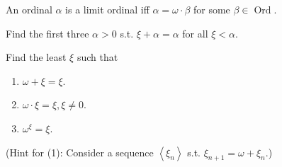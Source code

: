 \documentclass{ctexart}
\DeclareMathOperator{\ord}{Ord}
\begin{document}
\begin{problem}
An ordinal $\alpha$ is a limit ordinal iff $\alpha=\omega \cdot \beta$ for some $\beta \in\ord$.
\end{problem}



\begin{problem}
Find the first three $\alpha>0$ s.t. $\xi+\alpha=\alpha$ for all $\xi<\alpha$.
\end{problem}



\begin{problem}
Find the least $\xi$ such that
\begin{enumerate}[label=\alph*,ref=\theproblem.\alph*]
\item  $\omega+\xi=\xi$.
\item  $\omega \cdot \xi=\xi, \xi \neq 0$.
\item  $\omega^{\xi}=\xi$.
\end{enumerate}
(Hint for (1): Consider a sequence $\left\langle\xi_n\right\rangle$ s.t. $\xi_{n+1}=\omega+\xi_n$.)
\end{problem}
\end{document}
